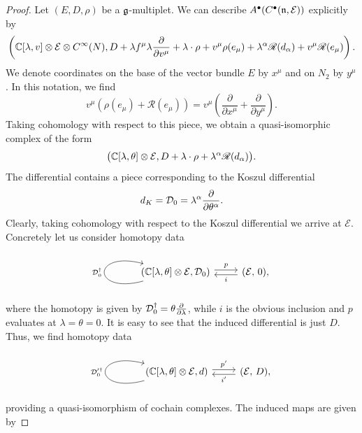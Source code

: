 \documentclass[11pt]{article}
\numberwithin{equation}{section}
\numberwithin{equation}{section}
\def\cE{\mathcal E}\def\cF{\mathcal F}\def\cG{\mathcal G}\def\cH{\mathcal H}
\def\bu{\bullet}
\def\d{{\rm d}}
\def\sR{\mathscr R}
\begin{document}
\begin{proof}
	Let $(E,D,\rho)$ be a $\mathfrak g$-multiplet. We can describe $A^\bullet(C^\bu(\fn , \cE))$ explicitly by
	\begin{equation*}
	\left( \CC[\lambda, v] \otimes \cE \otimes C^\infty(N) , D + \lambda f^\mu \lambda \frac{\partial}{\partial v^\mu} + \lambda \cdot \rho + v^\mu \rho(e_\mu) + \lambda^\alpha \sR(d_\alpha) + v^\mu \sR(e_\mu) \right) .
	\end{equation*}
	We denote coordinates on the base of the vector bundle $E$ by $x^\mu$ and on $N_2$ by $y^\mu$. In this notation, we find
	\begin{equation*}
	v^\mu\left( \rho(e_\mu) + \sR(e_\mu) \right) = v^\mu \left( \frac{\partial}{\partial x^\mu} + \frac{\partial}{\partial y^\mu} \right) .
	\end{equation*}
	Taking cohomology with respect to this piece, we obtain a quasi-isomorphic complex of the form
	\begin{equation*}
	\big( \CC[\lambda, \theta] \otimes \cE , D + \lambda \cdot \rho + \lambda^\alpha \sR(d_\alpha) \big) .
	\end{equation*}
	The differential contains a piece corresponding to the Koszul differential
	\begin{equation*}
	\d_K = \cD_0 = \lambda^\alpha \frac{\partial}{\partial \theta^\alpha} .
	\end{equation*}
	Clearly, taking cohomology with respect to the Koszul differential we arrive at $\cE$. Concretely let us consider homotopy data
	\begin{equation*}
	\begin{tikzcd}
	\arrow[loop left]{l}{\cD_0^\dagger}(\CC[\lambda,\theta] \otimes \cE , \cD_0 )\arrow[r, shift left, "p"] &( \cE , \, 0)\arrow[l, shift left, "i"] ,
	\end{tikzcd}
	\end{equation*}
	where the homotopy is given by $\mathcal D_0^\dagger = \theta \frac{\partial}{\partial \lambda}$, while $i$ is the obvious inclusion and $p$ evaluates at $\lambda = \theta = 0$. It is easy to see that the induced differential is just $D$. Thus, we find homotopy data
	\begin{equation} \label{eq: hdata}
	\begin{tikzcd}
	\arrow[loop left]{l}{\cD_0'^\dagger}(\CC[\lambda,\theta] \otimes \cE , d )\arrow[r, shift left, "p'"] &( \cE , \, D )\arrow[l, shift left, "i'"] ,
	\end{tikzcd}
	\end{equation}
	providing a quasi-isomorphism of cochain complexes. The induced maps are given by

\end{proof}
\end{document}
